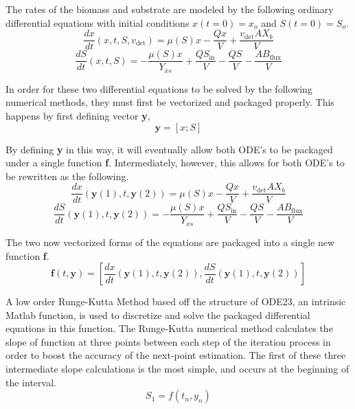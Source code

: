 \documentclass[letterpaper, twoside]{article}
\numberwithin{equation}{section}
\begin{document}
The rates of the biomass and substrate are modeled by the following ordinary differential equations with initial conditions $x(t=0)=x_o$ and $S(t=0)=S_o$.
\begin{equation} \label{eq: BiomassEquation}
  \frac{dx}{dt}(x,t,S,v_\mathrm{det}) = \mu(S) x - \frac{Q x}{V} + \frac{ v_{\mathrm{det}} A X_b}{V}
\end{equation}
\begin{equation} \label{eq: SubstrateEquation}
  \frac{dS}{dt}(x,t,S) = -\frac{\mu(S) x}{Y_{xs}} + \frac{Q S_{\mathrm{in}}}{V} - \frac{Q S}{V} - \frac{A B_{\mathrm{flux}}}{V}
\end{equation}

In order for these two differential equations to be solved by the following numerical methods, they must first be vectorized and packaged properly. This happens by first defining vector \textbf{y},
\begin{equation}
  \textbf{y} = [x;  S]
\end{equation}

By defining \textbf{y} in this way, it will eventually allow both ODE's to be packaged under a single function \textbf{f}. Intermediately, however, this allows for both ODE's to be rewritten as the following.
\begin{equation} \label{eq: BiomassEquationVectorized}
  \frac{dx}{dt}(\textbf{y}(1),t,\textbf{y}(2)) = \mu(S) x - \frac{Q x}{V} + \frac{ v_{\mathrm{det}} A X_b}{V}
\end{equation}
\begin{equation} \label{eq: SubstrateEquationVectorized}
  \frac{dS}{dt}(\textbf{y}(1),t,\textbf{y}(2)) = -\frac{\mu(S) x}{Y_{xs}} + \frac{Q S_{\mathrm{in}}}{V} - \frac{Q S}{V} - \frac{A B_{\mathrm{flux}}}{V}
\end{equation}

The two now vectorized forms of the equations are packaged into a single new function \textbf{f}.
\begin{equation} \label{eq: ODEpackagef}
  \textbf{f}(t,\textbf{y}) = \left[\frac{dx}{dt}\left(\textbf{y}(1),t,\textbf{y}(2)\right) , 
	      \frac{dS}{dt}\left(\textbf{y}(1),t,\textbf{y}(2)\right)\right]
\end{equation}

A low order Runge-Kutta Method based off the structure of ODE23, an intrinsic Matlab function, is used to discretize and solve the packaged differential equations in this function. The Runge-Kutta numerical method calculates the slope of function at three points between each step of the iteration process in order to boost the accuracy of the next-point estimation. The first of these three intermediate slope calculations is the most simple, and occurs at the beginning of the interval.
\begin{equation} \label{eq: S_1}
  S_1 = f(t_n,y_n)
\end{equation}
\end{document}
